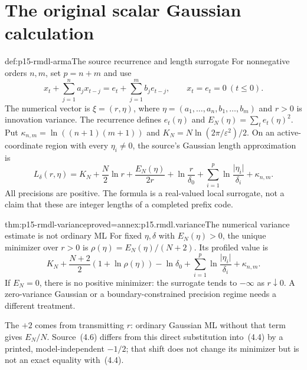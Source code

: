 \section{The original scalar Gaussian calculation}
\label{sec:p15-rmdl-gaussian}

\begin{hbdefinition}{def:p15-rmdl-arma}{The source recurrence and length surrogate}
For nonnegative orders \(n,m\), set \(p=n+m\) and use
\[
 x_t+\sum_{j=1}^na_jx_{t-j}
      =e_t+\sum_{j=1}^mb_je_{t-j},\qquad x_t=e_t=0\ (t\leq0).
\]
The numerical vector is \(\xi=(r,\eta)\), where
\(\eta=(a_1,\ldots,a_n,b_1,\ldots,b_m)\) and \(r>0\) is innovation
variance. The recurrence defines \(e_t(\eta)\) and
\(E_N(\eta)=\sum_te_t(\eta)^2\). Put
\(\kappa_{n,m}=\ln((n+1)(m+1))\) and
\(K_N=N\ln(2\pi/\varepsilon^2)/2\). On an active-coordinate region
with every \(\eta_i\ne0\), the source's Gaussian length approximation is
\[
 L_\delta(r,\eta)=K_N+\frac N2\ln r+
 \frac{E_N(\eta)}{2r}+\ln\frac r{\delta_0}
       +\sum_{i=1}^p\ln\frac{\lvert\eta_i\rvert}{\delta_i}+\kappa_{n,m}.
\]
All precisions are positive. The formula is a real-valued local surrogate,
not a claim that these are integer lengths of a completed prefix code.
\end{hbdefinition}

\begin{hbtheorem}{thm:p15-rmdl-variance}{proved=annex:p15.rmdl.variance}{The numerical variance estimate is not ordinary ML}
For fixed \(\eta,\delta\) with \(E_N(\eta)>0\), the unique minimizer
over \(r>0\) is
\(\rho(\eta)=E_N(\eta)/(N+2)\). Its profiled value is
\[
 K_N+\frac{N+2}{2}(1+\ln\rho(\eta))-\ln\delta_0
        +\sum_{i=1}^p\ln\frac{\lvert\eta_i\rvert}{\delta_i}+\kappa_{n,m}.
\]
If \(E_N=0\), there is no positive minimizer: the surrogate tends to
\(-\infty\) as \(r\downarrow0\). A zero-variance Gaussian or a
boundary-constrained precision regime needs a different treatment.
\end{hbtheorem}

The \(+2\) comes from transmitting \(r\): ordinary Gaussian ML without
that term gives \(E_N/N\). Source~(4.6) differs from this direct substitution
into~(4.4) by a printed, model-independent \(-1/2\); that shift does not
change its minimizer but is not an exact equality with~(4.4).

